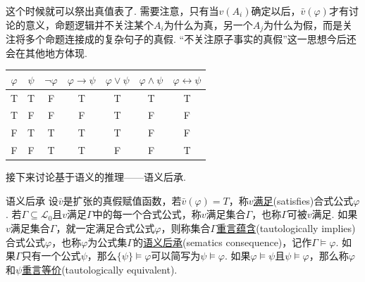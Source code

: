 \documentclass[main.tex]{subfiles}
\begin{document}
这个时候就可以祭出真值表了. 需要注意，只有当\(v(A_i)\)确定以后，\(\bar v(\varphi)\)才有讨论的意义，命题逻辑并不关注某个\(A_i\)为什么为真，另一个\(A_j\)为什么为假，而是关注将多个命题连接成的复杂句子的真假. “不关注原子事实的真假”这一思想今后还会在其他地方体现.

\begin{center}
    \begin{tabular}{cc|ccccc}
        \hline
        \(\varphi\) & \(\psi\) & \(\neg \varphi\) & \(\varphi \to \psi\) & \(\varphi \vee \psi\) & \(\varphi \wedge \psi\) & \(\varphi \leftrightarrow \psi\) \\
        \hline
        T & T & F & T & T & T & T \\
        T & F & F & F & T & F & F \\
        F & T & T & T & T & F & F \\
        F & F & T & T & F & F & T \\
        \hline
    \end{tabular}
\end{center}

接下来讨论基于语义的推理——语义后承.

\begin{definition}{语义后承}
    设\(\bar v\)是扩张的真假赋值函数，若\(\bar v(\varphi) = T\)，称\(v\)\uline{满足}(satisfies)合式公式\(\varphi\). \newline
    若\(\Gamma \subseteq \mathcal{L}_0\)且\(v\)满足\(\Gamma\)中的每一个合式公式，称\(v\)满足集合\(\Gamma\)，也称\(\Gamma\)可被\(v\)满足. \newline
    如果\(v\)满足集合\(\Gamma\)，就一定满足合式公式\(\varphi\)，则称集合\(\Gamma\)\uline{重言蕴含}(tautologically implies)合式公式\(\varphi\)，也称\(\varphi\)为公式集\(\Gamma\)的\uline{语义后承}(sematics consequence)，记作\(\Gamma \vDash \varphi\). \newline
    如果\(\Gamma\)只有一个公式\(\psi\)，那么\(\{\psi\} \vDash \varphi\)可以简写为\(\psi \vDash \varphi\). 如果\(\varphi \vDash \psi\)且\(\psi \vDash \varphi\)，那么称\(\varphi\)和\(\psi\)\uline{重言等价}(tautologically equivalent).
\end{definition}
\end{document}
